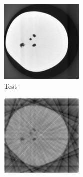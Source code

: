 \documentclass{article}
\begin{document}
\begin{figure}[!h]
    \begin{subfigure}[b]{0.3\linewidth}
        \includegraphics[width=\textwidth]{../images/potato/2D/cs_blurred_results/12_views/testIm.png}
        \caption{Test}
     \end{subfigure}
\quad
    \begin{subfigure}[b]{0.3\linewidth}
        \includegraphics[width=\textwidth]{../images/potato/2D/cs_blurred_results/12_views/result_FBP.png}

\end{subfigure}
\end{figure}
\end{document}
